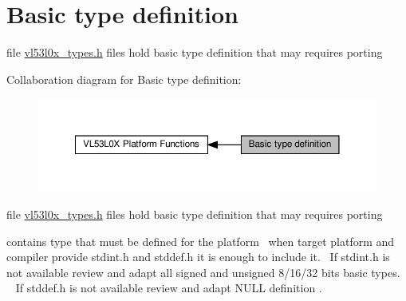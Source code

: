 \hypertarget{group__porting__type}{}\section{Basic type definition}
\label{group__porting__type}


file \hyperlink{vl53l0x__types_8h}{vl53l0x\+\_\+types.\+h} files hold basic type definition that may requires porting  


Collaboration diagram for Basic type definition\+:\nopagebreak
\begin{figure}[H]
\begin{center}
\leavevmode
\includegraphics[width=350pt]{group__porting__type}
\end{center}
\end{figure}
file \hyperlink{vl53l0x__types_8h}{vl53l0x\+\_\+types.\+h} files hold basic type definition that may requires porting 

contains type that must be defined for the platform~\newline
when target platform and compiler provide stdint.\+h and stddef.\+h it is enough to include it.~\newline
If stdint.\+h is not available review and adapt all signed and unsigned 8/16/32 bits basic types. ~\newline
If stddef.\+h is not available review and adapt N\+U\+LL definition . 